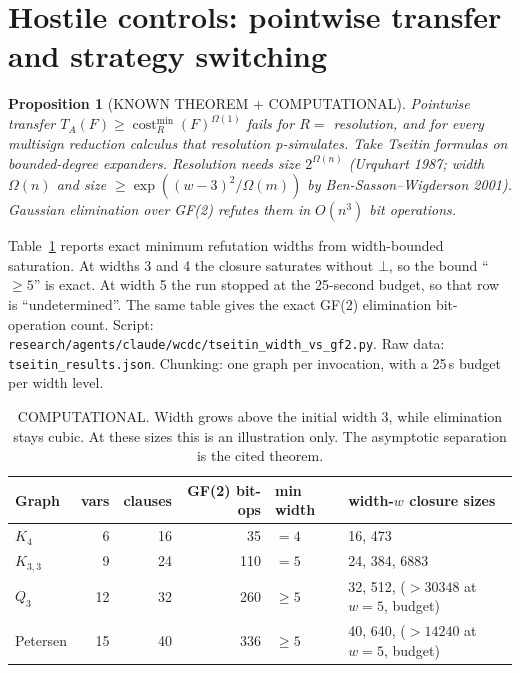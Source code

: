 \documentclass[11pt]{article}
\newtheorem{proposition}[theorem]{Proposition}
\theoremstyle{definition}
\newcommand{\cost}{\operatorname{cost}}
\begin{document}
\section{Hostile controls: pointwise transfer and strategy switching}
\begin{proposition}[KNOWN THEOREM + COMPUTATIONAL]\label{prop:tseitin}
Pointwise transfer $T_A(F)\ge\cost_R^{\min}(F)^{\Omega(1)}$ fails for $R=$ resolution,
and for every multisign reduction calculus that resolution p-simulates. Take Tseitin
formulas on bounded-degree expanders. Resolution needs size $2^{\Omega(n)}$ (Urquhart 1987;
width $\Omega(n)$ and size $\ge\exp((w-3)^2/\Omega(m))$ by Ben-Sasson--Wigderson 2001).
Gaussian elimination over GF(2) refutes them in $O(n^3)$ bit operations.
\end{proposition}
Table~\ref{tab:ts} reports exact minimum refutation widths from width-bounded saturation.
At widths 3 and 4 the closure saturates without $\bot$, so the bound ``$\ge5$'' is exact.
At width 5 the run stopped at the 25-second budget, so that row is ``undetermined''. The
same table gives the exact GF(2) elimination bit-operation count. Script:
\texttt{research/agents/claude/wcdc/tseitin\_width\_vs\_gf2.py}. Raw data:
\texttt{tseitin\_results.json}. Chunking: one graph per invocation, with a 25\,s budget
per width level.
\begin{table}[h]\centering
\begin{tabular}{lrrrll}\toprule
Graph & vars & clauses & GF(2) bit-ops & min width & width-$w$ closure sizes\\\midrule
$K_4$ & 6 & 16 & 35 & $=4$ & 16, 473\\
$K_{3,3}$ & 9 & 24 & 110 & $=5$ & 24, 384, 6883\\
$Q_3$ & 12 & 32 & 260 & $\ge5$ & 32, 512, ($>30348$ at $w{=}5$, budget)\\
Petersen & 15 & 40 & 336 & $\ge5$ & 40, 640, ($>14240$ at $w{=}5$, budget)\\\bottomrule
\end{tabular}
\caption{COMPUTATIONAL. Width grows above the initial width 3, while elimination stays
cubic. At these sizes this is an illustration only. The asymptotic separation is the
cited theorem.}\label{tab:ts}
\end{table}
\end{document}
